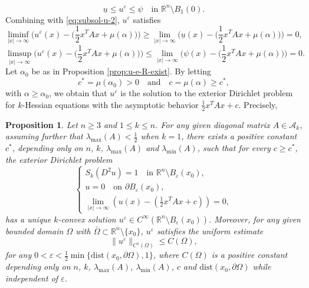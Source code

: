 \documentclass[reqno]{amsart}
\newtheorem{proposition}[theorem]{Proposition}
\theoremstyle{remark}
\theoremstyle{definition}
\numberwithin{equation}{section}
\begin{document}
\begin{equation}\label{eq:u-ue-psi}
	\underline{u}\leq u^{\varepsilon}\leq \psi\quad\text{in }\mathbb{R}^n\setminus B_1(0).
\end{equation}
Combining with \eqref{eq:subsol-u-2}, $u^\varepsilon$ satisfies 
\[
\liminf_{|x|\to\infty}\bigg(u^\varepsilon(x)-\bigg(\frac{1}{2}x^TAx+\mu(\alpha)\bigg)\bigg)\geq\lim_{|x|\to\infty}\bigg(\underline{u}(x)-\bigg(\frac{1}{2}x^TAx+\mu(\alpha)\bigg)\bigg)=0,
\]
\[
\limsup_{|x|\to\infty}\bigg(u^\varepsilon(x)-\bigg(\frac{1}{2}x^TAx+\mu(\alpha)\bigg)\bigg)\leq\lim_{|x|\to\infty}\bigg(\psi(x)-\bigg(\frac{1}{2}x^TAx+\mu(\alpha)\bigg)\bigg)=0.
\]
Let $\alpha_0$ be as in Proposition \ref{prop:u-e-R-exist}. By letting 
\begin{equation}\label{eq:c*-c}
	c^*=\mu(\alpha_0)>0\quad\text{and}\quad c=\mu(\alpha)\geq c^*,
\end{equation} 
with $\alpha\geq\alpha_0$, we obtain that $u^\varepsilon$ is the solution to the exterior Dirichlet problem for $k$-Hessian equations with the asymptotic behavior $\frac{1}{2}x^TAx+c$. Precisely,
\begin{proposition}\label{prop:u-e}
	Let $n\geq3$ and $1\leq k\leq n$. For any given diagonal matrix $A\in\mathcal{A}_k$, assuming further that $\lambda_{\mathrm{max}}(A)<\frac{1}{2} $ when $k=1$, there exists a positive constant $c^*$, depending only on $n$, $k$, $\lambda_{\mathrm{max}}(A)$ and $\lambda_{\mathrm{min}}(A)$, such that for every $c\geq c^*$, the exterior Dirichlet problem 
	\begin{equation}\label{eq:EDP-u-e}
	\begin{cases}
		S_k(D^2u)=1 \quad\text{in }\mathbb{R}^n\setminus B_\varepsilon(x_0), \\
		u=0 \quad\text{on }\partial B_{\varepsilon}(x_0), \\
		\lim\limits_{|x|\to\infty}(u(x)-(\frac{1}{2}x^TAx+c))=0, 
	\end{cases}
\end{equation}
	has a unique $k$-convex solution  $u^\varepsilon\in C^\infty(\mathbb{R}^n\setminus B_\varepsilon(x_0))$. Moreover, for any given bounded domain $\Omega$ with $\bar{\Omega}\subset\mathbb{R}^n\setminus\{x_0\}$, $u^\varepsilon$ satisfies the uniform estimate 
	\[\|u^\varepsilon\|_{C^1(\Omega)}\leq C(\Omega),\]
	for any $0<\varepsilon<\frac{1}{2}\min\{\mathrm{dist}(x_0,\partial\Omega),1\}$, where $C(\Omega)$ is a positive constant depending only on $n$, $k$, $\lambda_{\mathrm{max}}(A)$, $\lambda_{\mathrm{min}}(A)$, $c$ and $\mathrm{dist}(x_0, \partial\Omega)$ while independent of $\varepsilon$.
\end{proposition}
\end{document}
